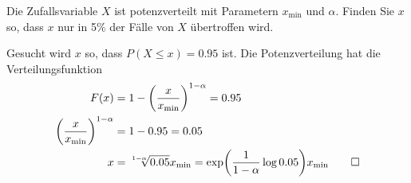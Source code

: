 Die Zufallsvariable $X$ ist potenzverteilt mit Parametern $x_{\text{min}}$
und $\alpha$.
Finden Sie $x$ so, dass $x$ nur in 5\% der Fälle von $X$ übertroffen wird.


\begin{loesung}
Gesucht wird $x$ so, dass $P(X\le x)=0.95$ ist.
Die Potenzverteilung hat die Verteilungsfunktion
\begin{align*}
F(x)
&=1-\biggl(\frac{x}{x_{\text{min}}}\biggr)^{1-\alpha}=0.95
\\
\biggl(\frac{x}{x_{\text{min}}}\biggr)^{1-\alpha}
&=1-0.95=0.05
\\
x&=\root{1-\alpha}\of{0.05} x_{\text{min}}
=
\exp\biggl(
\frac1{1-\alpha}\log 0.05
\biggr)
x_{\text{min}}
\qedhere
\end{align*}
\end{loesung}

